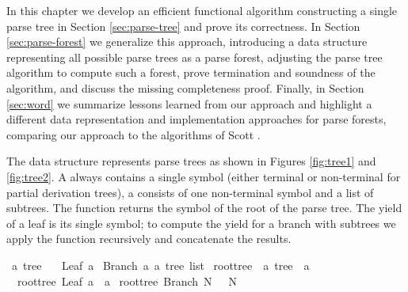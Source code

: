 \begin{isabellebody}
\begin{isamarkuptext}
In this chapter we develop an efficient functional algorithm constructing a single parse
tree in Section \ref{sec:parse-tree} and prove its correctness. In Section \ref{sec:parse-forest}
we generalize this approach, introducing a data structure representing all possible parse trees
as a parse forest, adjusting the parse tree algorithm to compute such a forest, prove termination
and soundness of the algorithm, and discuss the missing completeness proof. Finally, in Section \ref{sec:word}
we summarize lessons learned from our approach and highlight a different data representation and
implementation approaches for parse forests, comparing our approach to the algorithms of Scott \cite{Scott:2008}.%
\end{isamarkuptext}\isamarkuptrue%
%
\isadelimdocument
%
\endisadelimdocument
%
\isatagdocument
%
\isamarkuptrue%
%
\endisatagdocument
{\isafolddocument}%
%
\isadelimdocument
%
\endisadelimdocument
%
\begin{isamarkuptext}%
The data structure  represents parse trees as shown in Figures \ref{fig:tree1} and \ref{fig:tree2}.
A  always contains a single symbol (either terminal or non-terminal for partial derivation trees), a  consists of one non-terminal
symbol and a list of subtrees. The function  returns the symbol of the root of the
parse tree. The yield of a leaf is its single symbol; to compute the yield for a branch with
subtrees  we apply the function  recursively and concatenate the results.%
\end{isamarkuptext}\isamarkuptrue%
\isamarkupfalse%
\ {\isacharprime}{\kern0pt}a\ tree\ {\isacharequal}{\kern0pt}\isanewline
\ \ Leaf\ {\isacharprime}{\kern0pt}a\isanewline
{\isacharbar}{\kern0pt}\ Branch\ {\isacharprime}{\kern0pt}a\ {\isachardoublequoteopen}{\isacharprime}{\kern0pt}a\ tree\ list{\isachardoublequoteclose}\isanewline
\isanewline
{}\isamarkupfalse%
\ root{\isacharunderscore}{\kern0pt}tree\ {\isacharcolon}{\kern0pt}{\isacharcolon}{\kern0pt}\ {\isachardoublequoteopen}{\isacharprime}{\kern0pt}a\ tree\ {\isasymRightarrow}\ {\isacharprime}{\kern0pt}a{\isachardoublequoteclose}\ \isanewline
\ \ {\isachardoublequoteopen}root{\isacharunderscore}{\kern0pt}tree\ {\isacharparenleft}{\kern0pt}Leaf\ a{\isacharparenright}{\kern0pt}\ {\isacharequal}{\kern0pt}\ a{\isachardoublequoteclose}\isanewline
{\isacharbar}{\kern0pt}\ {\isachardoublequoteopen}root{\isacharunderscore}{\kern0pt}tree\ {\isacharparenleft}{\kern0pt}Branch\ N\ {\isacharunderscore}{\kern0pt}{\isacharparenright}{\kern0pt}\ {\isacharequal}{\kern0pt}\ N{\isachardoublequoteclose}\isanewline

\end{isabellebody}
